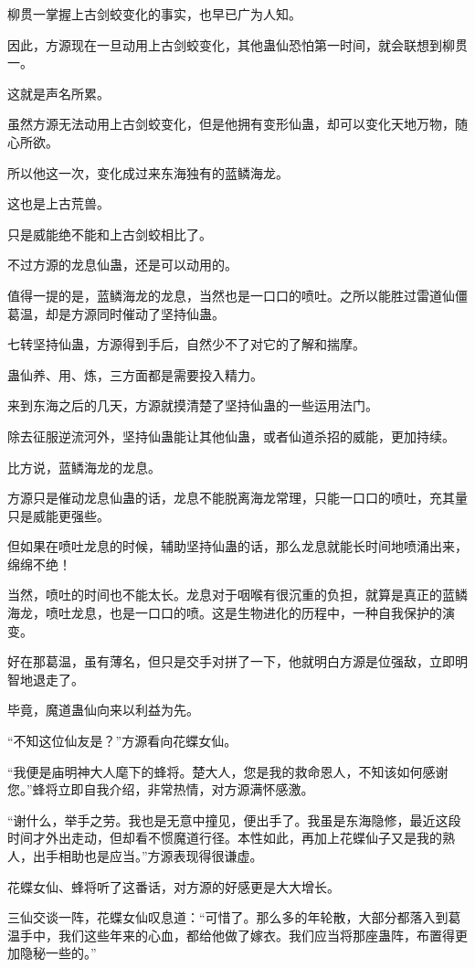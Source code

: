 \begin{this_body}
柳贯一掌握上古剑蛟变化的事实，也早已广为人知。

因此，方源现在一旦动用上古剑蛟变化，其他蛊仙恐怕第一时间，就会联想到柳贯一。

这就是声名所累。

虽然方源无法动用上古剑蛟变化，但是他拥有变形仙蛊，却可以变化天地万物，随心所欲。

所以他这一次，变化成过来东海独有的蓝鳞海龙。

这也是上古荒兽。

只是威能绝不能和上古剑蛟相比了。

不过方源的龙息仙蛊，还是可以动用的。

值得一提的是，蓝鳞海龙的龙息，当然也是一口口的喷吐。之所以能胜过雷道仙僵葛温，却是方源同时催动了坚持仙蛊。

七转坚持仙蛊，方源得到手后，自然少不了对它的了解和揣摩。

蛊仙养、用、炼，三方面都是需要投入精力。

来到东海之后的几天，方源就摸清楚了坚持仙蛊的一些运用法门。

除去征服逆流河外，坚持仙蛊能让其他仙蛊，或者仙道杀招的威能，更加持续。

比方说，蓝鳞海龙的龙息。

方源只是催动龙息仙蛊的话，龙息不能脱离海龙常理，只能一口口的喷吐，充其量只是威能更强些。

但如果在喷吐龙息的时候，辅助坚持仙蛊的话，那么龙息就能长时间地喷涌出来，绵绵不绝！

当然，喷吐的时间也不能太长。龙息对于咽喉有很沉重的负担，就算是真正的蓝鳞海龙，喷吐龙息，也是一口口的喷。这是生物进化的历程中，一种自我保护的演变。

好在那葛温，虽有薄名，但只是交手对拼了一下，他就明白方源是位强敌，立即明智地退走了。

毕竟，魔道蛊仙向来以利益为先。

“不知这位仙友是？”方源看向花蝶女仙。

“我便是庙明神大人麾下的蜂将。楚大人，您是我的救命恩人，不知该如何感谢您。”蜂将立即自我介绍，非常热情，对方源满怀感激。

“谢什么，举手之劳。我也是无意中撞见，便出手了。我虽是东海隐修，最近这段时间才外出走动，但却看不惯魔道行径。本性如此，再加上花蝶仙子又是我的熟人，出手相助也是应当。”方源表现得很谦虚。

花蝶女仙、蜂将听了这番话，对方源的好感更是大大增长。

三仙交谈一阵，花蝶女仙叹息道：“可惜了。那么多的年轮散，大部分都落入到葛温手中，我们这些年来的心血，都给他做了嫁衣。我们应当将那座蛊阵，布置得更加隐秘一些的。”


\end{this_body}
